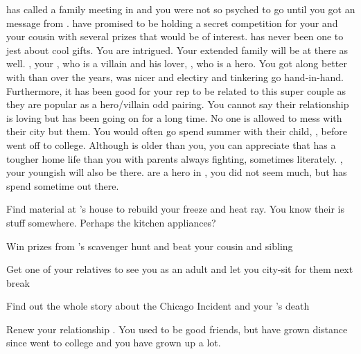 \documentclass[char]{LRSguildcamp1}
\begin{document}
\cGrandma{} has called a family meeting in \pCityGrandma{} and you were not so psyched to go until you got an message from \cGrandma{}. \cGrandma{\they} have promised to be holding a secret competition for your and your cousin with several prizes that would be of interest. \cGrandma{} has never been one to jest about cool gifts. You are intrigued.  Your extended family will be at there as well. \cOldest{}, your \cOldest{\uncle}, who is a villain and his lover, \cOS{}, who is a hero. 
You got along better with \cOS{} than \cOldest{} over the years, \cOS{\they} was nicer and electiry and tinkering go hand-in-hand. Furthermore, it has been good for your rep to be related to this super couple as they are popular as a hero/villain odd pairing. You cannot say their relationship is loving but has been going on for a long time. No one is allowed to mess with their city but them.  You would often go spend summer with their child, \cGrad{}, before \cGrad{\they} went off to college. Although \cGrad{} is older than you, you can appreciate that \cGrad{} has a tougher home life than you with parents always fighting, sometimes literately. \cYoungest{}, your youngish \cYoungest{\uncle} will also be there.  are a hero in \pCityYoungest{}, you did not seem \cYoungest{\them} much, but \cTween{} has spend sometime out there. 


 
\begin{itemz}[Goals]
	\item Find material at \cGrandma{}'s house to rebuild your freeze and heat ray. You know their is stuff somewhere. Perhaps the kitchen appliances? 
		\item Win prizes from \cGrandma{}'s scavenger hunt and beat your cousin and sibling
		\item Get one of your relatives to see you as an adult and let you city-sit for them next break
		\item Find out the whole story about the Chicago Incident and your \cAS{\parent}'s death
		\item Renew your relationship \cGrad{}. You used to be good friends, but have grown distance since \cGrad{} went to college and you have grown up a lot.
\end{itemz}
\end{document}
